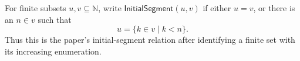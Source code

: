 \begin{definition}
For finite subsets $u,v\subseteq\mathbb N$, write
$\mathsf{InitialSegment}(u,v)$ if either $u=v$, or there is an $n\in v$
such that
\[
u=\{k\in v\mid k<n\}.
\]
Thus this is the paper's initial-segment relation after identifying a finite
set with its increasing enumeration.
\end{definition}
